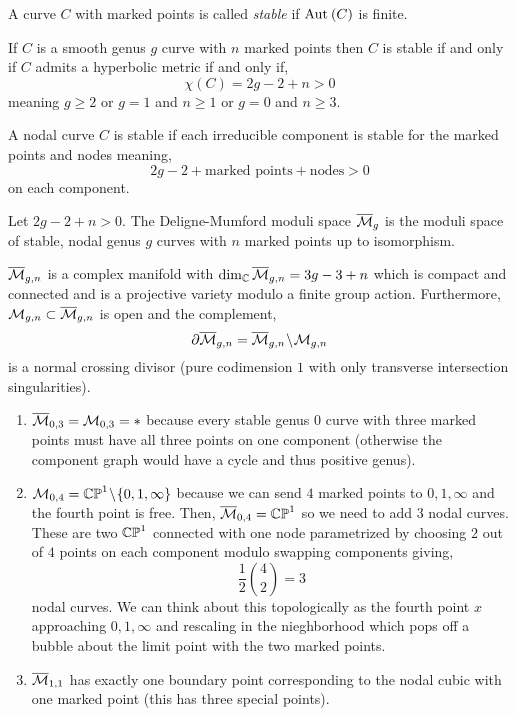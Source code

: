 \documentclass[12pt]{article}
\begin{document}
\begin{defn}
A curve $C$ with marked points is called \textit{stable} if $\mathrm{Aut}_{} \left( C \right)$ is finite.
\end{defn}

\begin{prop}
If $C$ is a smooth genus $g$ curve with $n$ marked points then $C$ is stable if and only if $C$ admits a hyperbolic metric if and only if,
\[ \chi(C) = 2g - 2 + n > 0 \]
meaning $g \ge 2$ or $g = 1$ and $n \ge 1$ or $g = 0$ and $n \ge 3$. 
\end{prop}

\begin{defn}
A nodal curve $C$ is stable if each irreducible component is stable for the marked points and nodes meaning,
\[ 2g - 2 + \text{marked points} + \text{nodes} > 0 \]
on each component. 
\end{defn}

\begin{defn}
Let $2g - 2 + n > 0$. The Deligne-Mumford moduli space $\overline{\mathcal{M}}_g$ is the moduli space of stable, nodal genus $g$ curves with $n$ marked points up to isomorphism. 
\end{defn}

\begin{thm}
$\overline{\mathcal{M}}_{g,n}$ is a complex manifold with $\dim_{\mathbb{C}} \overline{\mathcal{M}}_{g,n} = 3 g - 3 + n$ which is compact and connected and is a projective variety modulo a finite group action. Furthermore, $\mathcal{M}_{g,n} \subset \overline{\mathcal{M}}_{g,n}$ is open and the complement,
\[ \partial \overline{\mathcal{M}}_{g,n} = \overline{\mathcal{M}}_{g,n} \! \setminus \! \mathcal{M}_{g,n} \]
is a normal crossing divisor (pure codimension $1$ with only transverse intersection singularities).  
\end{thm}

\begin{example}
\begin{enumerate}
\item $\overline{\mathcal{M}}_{0,3} = \mathcal{M}_{0,3} = *$ because every stable genus $0$ curve with three marked points must have all three points on one component (otherwise the component graph would have a cycle and thus positive genus). 

\item $\mathcal{M}_{0,4} = \mathbb{CP}^1 \! \setminus \! \{ 0, 1, \infty \}$ because we can send $4$ marked points to $0,1,\infty$ and the fourth point is free. Then, $\overline{\mathcal{M}}_{0,4} = \mathbb{CP}^1$ so we need to add $3$ nodal curves. These are two $\mathbb{CP}^1$ connected with one node parametrized by choosing $2$ out of $4$ points on each component modulo swapping components giving,
\[ \frac{1}{2} { 4 \choose 2 } = 3 \]
nodal curves. We can think about this topologically as the fourth point $x$ approaching $0,1,\infty$ and rescaling in the nieghborhood which pops off a bubble about the limit point with the two marked points. 

\item $\overline{\mathcal{M}}_{1,1}$ has exactly one boundary point corresponding to the nodal cubic with one marked point (this has three special points). 
\end{enumerate}
\end{example}
\end{document}
